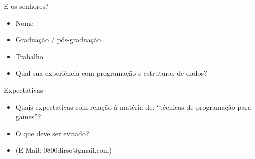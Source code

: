 \begin{frame}	
	\begin{block}{E os senhores?}
		\begin{itemize}
			\item Nome
			\item Graduação / pós-graduação
			\item Trabalho
			\item Qual sua experiência com programação e estruturas de dados?
		\end{itemize}
	\end{block}
\end{frame}

\begin{frame}	
	\begin{block}{Expectativas}
		\begin{itemize}
			\item Quais expectativas com relação à matéria de: “técnicas de programação para games”?
			\item O que deve ser evitado?
			\item (E-Mail: 0800dirso@gmail.com)
		\end{itemize}
	\end{block}
\end{frame}